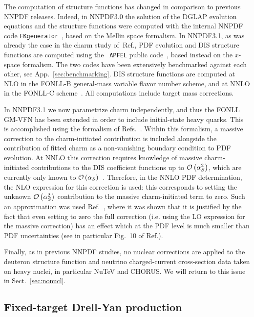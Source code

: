 The computation of structure functions has changed in comparison to
previous NNPDF releases. Indeed, in
NNPDF3.0 the solution of the DGLAP evolution equations
and the structure functions were computed with the
internal NNPDF code {\tt FKgenerator}~\cite{Ball:2008by,Ball:2010de},
based on the Mellin space formalism.
%
In NNPDF3.1, as was already the case in the charm study 
of~Ref.\cite{Ball:2016neh}, PDF
evolution and DIS structure functions are computed using the {\tt
 APFEL} public code~\cite{Bertone:2013vaa}, based instead on the
$x$-space formalism.
%
The two codes have been extensively benchmarked against each other,
see  
App.~\ref{sec:benchmarking}.
%
DIS structure functions are computed at NLO in the FONLL-B general-mass 
variable flavor number scheme, and at NNLO in the FONLL-C 
scheme~\cite{Forte:2010ta}.
%
All computations include target mass corrections.

In NNPDF3.1 we now parametrize charm independently, and thus
the FONLL GM-VFN has been extended in order to include
initial-state heavy quarks. This is accomplished using the formalism of
Refs.~\cite{Ball:2015tna,Ball:2015dpa}. Within this formalism, a
massive correction to the charm-initiated contribution is included
alongside the contribution of fitted charm as a non-vanishing boundary
condition to PDF evolution. 
 At NNLO this correction
requires knowledge of massive 
charm-initiated contributions to the DIS coefficient functions up to
$\mathcal{O}\left( \alpha_S^2\right)$, which are currently only known
to $\mathcal{O}\left( \alpha_S\right)$~\cite{Kretzer:1998ju}.
%
Therefore, in the NNLO PDF determination, the NLO expression for this
correction is used: this corresponds to setting the 
 unknown $\mathcal{O}\left(
\alpha^2_S\right)$ contribution to the massive charm-initiated term
to zero. Such an approximation was used
Ref.~\cite{Ball:2016neh}, where it was shown that it is justified
by the fact that even setting to zero the full correction  (i.e. using
the LO expression for the massive correction) has an
effect which at the PDF level is much smaller
than PDF uncertainties (see in
particular Fig.~10 of Ref.\cite{Ball:2016neh}).

Finally, as in previous NNPDF studies,  
no nuclear corrections are applied to the deuteron structure function and
neutrino charged-current cross-section
data taken on heavy nuclei, in particular NuTeV and CHORUS. We will return to
this issue in Sect.~\ref{sec:nonucl}.


\subsection{Fixed-target Drell-Yan production}

